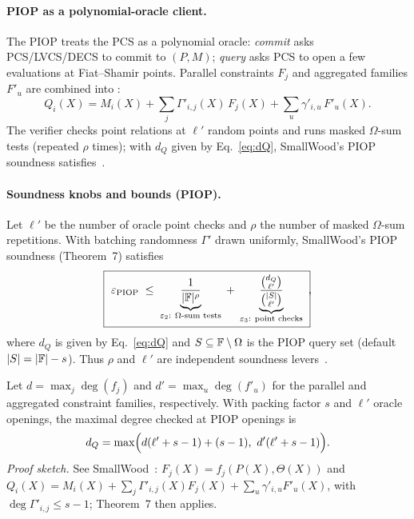 \paragraph{PIOP as a polynomial-oracle client.}
The PIOP treats the PCS as a polynomial oracle: \emph{commit} asks PCS/LVCS/DECS to commit to $(P,M)$; \emph{query} asks PCS to open a few evaluations at Fiat--Shamir points. Parallel constraints $F_j$ and aggregated families $F'_u$ are combined into :
\begin{equation}\label{eq:Qi-def}
Q_i(X)=M_i(X)+\sum_j\Gamma'_{i,j}(X)\,F_j(X)+\sum_u\gamma'_{i,u}\,F'_u(X).
\end{equation}
The verifier checks point relations at $\ell'$ random points and runs masked $\Omega$-sum tests (repeated $\rho$ times); with $d_Q$ given by Eq.~\eqref{eq:dQ}, SmallWood’s PIOP soundness satisfies~\cite[Thm.~7]{cryptoeprint:2025/1085}.

\paragraph{Soundness knobs and bounds (PIOP).}
Let $\ell'$ be the number of oracle point checks and $\rho$ the number of masked $\Omega$-sum repetitions. With batching randomness $\Gamma'$ drawn uniformly, SmallWood’s PIOP soundness (Theorem~7) satisfies
\[
\boxed{\ \varepsilon_{\mathrm{PIOP}} \;\le\; \underbrace{\frac{1}{|\F|^{\rho}}}_{\varepsilon_2:\ \Omega\text{-sum tests}}\;+\; \underbrace{\frac{\binom{d_Q}{\ell'}}{\binom{|S|}{\ell'}}}_{\varepsilon_3:\ \text{point checks}}\ }\!,
\]
where $d_Q$ is given by Eq.~\eqref{eq:dQ} and $S\subseteq\mathbb{F}\setminus\Omega$ is the PIOP query set (default $|S|=|\mathbb{F}|-s$). Thus $\rho$ and $\ell'$ are independent soundness levers~\cite[Thm.~7]{cryptoeprint:2025/1085}.

\begin{lemma}
Let $d=\max_j\deg(f_j)$ and $d'=\max_u\deg(f'_u)$ for the parallel and aggregated constraint families, respectively.
With packing factor $s$ and $\ell'$ oracle openings, the maximal degree checked at PIOP openings is
\begin{equation}\label{eq:dQ}
d_Q=\max\Bigl(d(\ell'+s-1)+(s-1),\ d'(\ell'+s-1)\Bigr).
\end{equation}
\emph{Proof sketch.} See SmallWood~\cite[Fig.~6 \& Eq.~(3)]{cryptoeprint:2025/1085}: $F_j(X)=f_j(P(X),\Theta(X))$ and $Q_i(X)=M_i(X)+\sum_j \Gamma'_{i,j}(X)F_j(X)+\sum_u \gamma'_{i,u}F'_u(X)$, with $\deg\Gamma'_{i,j}\le s-1$; Theorem~7 then applies.
\end{lemma}

